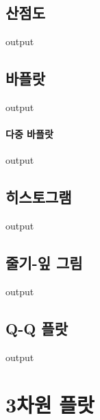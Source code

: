 \documentclass{book}
\begin{document}
\subsection{산점도}
\begin{Schunk}
\begin{Soutput}
output
\end{Soutput}
\end{Schunk}
\subsection{바플랏}
\begin{Schunk}
\begin{Soutput}
output
\end{Soutput}
\end{Schunk}
\paragraph{다중 바플랏}
\begin{Schunk}
\begin{Soutput}
output
\end{Soutput}
\end{Schunk}
\subsection{히스토그램}
\begin{Schunk}
\begin{Soutput}
output
\end{Soutput}
\end{Schunk}
\subsection{줄기-잎 그림}
\begin{Schunk}
\begin{Soutput}
output
\end{Soutput}
\end{Schunk}
\subsection{Q-Q 플랏}
\begin{Schunk}
\begin{Soutput}
output
\end{Soutput}
\end{Schunk}

\section{3차원 플랏}
\end{document}
